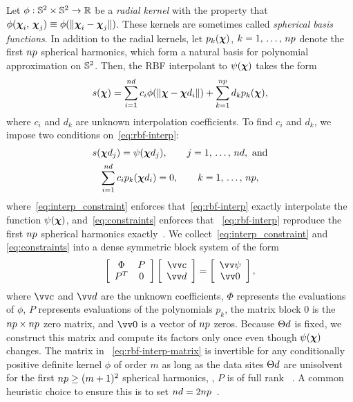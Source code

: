 Let $\phi:\mathbb{S}^2\times\mathbb{S}^2\to\mathbb{R}$ be a \emph{radial kernel} with the property that
$\phi(\boldsymbol{\chi}_i,\,\boldsymbol{\chi}_j)\equiv\phi(\|\boldsymbol{\chi}_i-\boldsymbol{\chi}_j\|)$. These kernels are
sometimes called \emph{spherical basis functions}. In addition to the radial kernels, let
$p_k(\boldsymbol{\chi})$, $k=1,\,\ldots,\,\poly\cardinality$ denote the first $\poly\cardinality$
spherical harmonics, which form a natural basis for polynomial approximation on
$\mathbb{S}^2$. Then, the RBF interpolant to $\psi(\boldsymbol{\chi})$ takes the form
\begin{equation}\label{eq:rbf-interp}
    s(\Xp)
    = \sum_{i=1}^{\data\cardinality} c_i \phi(\|\Xp-\data\Xp_i\|)
    + \sum_{k=1}^{\poly\cardinality} d_k p_k(\Xp),
\end{equation}
where $c_i$ and $d_k$ are unknown interpolation coefficients. To find $c_i$ and $d_k$, we
impose two conditions on~\eqref{eq:rbf-interp}:
\begin{gather}
    s(\data\Xp_j) = \psi(\data\Xp_j), \qquad j=1,\,\ldots,\,\data\cardinality,~\text{and} \label{eq:interp_constraint} \\
    \sum_{i=1}^{\data\cardinality} c_i p_k(\data\Xp_i) = 0, \qquad k=1,\,\ldots,\,\poly\cardinality, \label{eq:constraints}
\end{gather}
where~\eqref{eq:interp_constraint} enforces that~\eqref{eq:rbf-interp} exactly
interpolate the function $\psi(\boldsymbol{\chi})$, and~\eqref{eq:constraints} enforces that~%
\eqref{eq:rbf-interp} reproduce the first $\poly\cardinality$ spherical harmonics
exactly~\cite{Fasshauer:2007ui}. We collect~\eqref{eq:interp_constraint} and~%
\eqref{eq:constraints} into a dense symmetric block system of the form
\begin{equation}\label{eq:rbf-interp-matrix}
    \left[\begin{array}{cc}
            \Phi & P \\ P^T & 0
    \end{array}\right]\left[\begin{array}{c}
            \arr{c} \\ \arr{d}
    \end{array}\right] = \left[\begin{array}{c}
            \arr{\psi} \\ \arr{0}
    \end{array}\right],
\end{equation}
where $\arr{c}$ and $\arr{d}$ are the unknown coefficients, $\Phi$ represents the
evaluations of $\phi$, $P$ represents evaluations of the polynomials $p_k$, the matrix
block $0$ is the $\poly\cardinality\times\poly\cardinality$ zero matrix, and $\arr{0}$ is
a vector of $\poly\cardinality$ zeros. Because $\data\sites$ is fixed, we construct this
matrix and compute its factors only once even though $\psi(\boldsymbol{\chi})$ changes. The matrix in~%
\eqref{eq:rbf-interp-matrix} is invertible for any conditionally positive definite kernel
$\phi$ of order $m$ as long as the data sites $\data\sites$ are unisolvent for the first
$\poly\cardinality \ge (m+1)^2$ spherical harmonics, , $P$ is of full rank~%
\cite{Fasshauer:2007ui}. A common heuristic choice to ensure this is to set
$\data\cardinality = 2 \poly\cardinality$~\cite{SWJCP2018}. 


